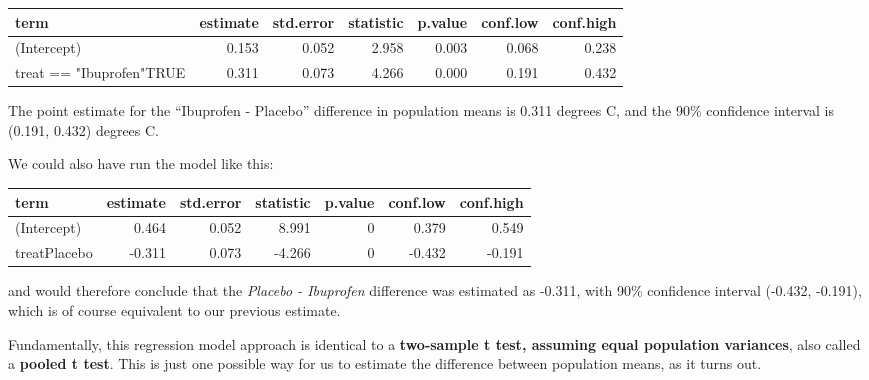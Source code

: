 \documentclass[
]{book}
\newenvironment{Shaded}{\begin{snugshade}}{\end{snugshade}}
\newcommand{\DataTypeTok}[1]{\textcolor[rgb]{0.13,0.29,0.53}{#1}}
\newcommand{\DecValTok}[1]{\textcolor[rgb]{0.00,0.00,0.81}{#1}}
\newcommand{\FloatTok}[1]{\textcolor[rgb]{0.00,0.00,0.81}{#1}}
\newcommand{\KeywordTok}[1]{\textcolor[rgb]{0.13,0.29,0.53}{\textbf{#1}}}
\newcommand{\NormalTok}[1]{#1}
\newcommand{\OperatorTok}[1]{\textcolor[rgb]{0.81,0.36,0.00}{\textbf{#1}}}
\newcommand{\OtherTok}[1]{\textcolor[rgb]{0.56,0.35,0.01}{#1}}
\newcommand{\StringTok}[1]{\textcolor[rgb]{0.31,0.60,0.02}{#1}}
\begin{document}
\begin{tabular}{l|r|r|r|r|r|r}
\hline
term & estimate & std.error & statistic & p.value & conf.low & conf.high\\
\hline
(Intercept) & 0.153 & 0.052 & 2.958 & 0.003 & 0.068 & 0.238\\
\hline
treat == "Ibuprofen"TRUE & 0.311 & 0.073 & 4.266 & 0.000 & 0.191 & 0.432\\
\hline
\end{tabular}

The point estimate for the ``Ibuprofen - Placebo'' difference in population means is 0.311 degrees C, and the 90\% confidence interval is (0.191, 0.432) degrees C.

We could also have run the model like this:

\begin{Shaded}
\end{Shaded}

\begin{tabular}{l|r|r|r|r|r|r}
\hline
term & estimate & std.error & statistic & p.value & conf.low & conf.high\\
\hline
(Intercept) & 0.464 & 0.052 & 8.991 & 0 & 0.379 & 0.549\\
\hline
treatPlacebo & -0.311 & 0.073 & -4.266 & 0 & -0.432 & -0.191\\
\hline
\end{tabular}

and would therefore conclude that the \emph{Placebo - Ibuprofen} difference was estimated as -0.311, with 90\% confidence interval (-0.432, -0.191), which is of course equivalent to our previous estimate.

Fundamentally, this regression model approach is identical to a \textbf{two-sample t test, assuming equal population variances}, also called a \textbf{pooled t test}. This is just one possible way for us to estimate the difference between population means, as it turns out.
\end{document}
